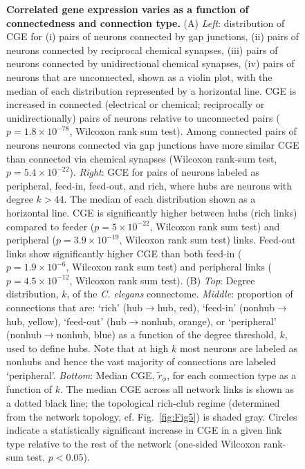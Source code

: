 \documentclass[10pt,letterpaper]{article}
\begin{document}
 \begin{figure}[h]
 \centering
\caption{{\bf Correlated gene expression varies as a function of connectedness and connection type.}
(A) \textit{Left}: distribution of CGE for (i) pairs of neurons connected by gap junctions, (ii) pairs of neurons connected by reciprocal chemical synapses, (iii) pairs of neurons connected by unidirectional chemical synapses, (iv) pairs of neurons that are unconnected, shown as a violin plot, with the median of each distribution represented by a horizontal line.
CGE is increased in connected (electrical or chemical; reciprocally or unidirectionally) pairs of neurons relative to unconnected pairs ($p = 1.8 \times 10^{-78}$, Wilcoxon rank sum test).
Among connected pairs of neurons neurons connected via gap junctions have more similar CGE than connected via chemical synapses (Wilcoxon rank-sum test, $p = 5.4 \times 10^{-22}$).
\textit{Right}: GCE for pairs of neurons labeled as peripheral, feed-in, feed-out, and rich, where hubs are neurons with degree $k>44$. The median of each distribution shown as a horizontal line.
CGE is significantly higher between hubs (rich links) compared to feeder ($p = 5 \times 10^{-22}$, Wilcoxon rank sum test) and peripheral ($p = 3.9 \times 10^{-19}$, Wilcoxon rank sum test) links.
Feed-out links show significantly higher CGE than both feed-in ($p = 1.9 \times 10^{-6}$, Wilcoxon rank sum test) and peripheral links ($p = 4.5 \times 10^{-12}$, Wilcoxon rank sum test).
(B)
\emph{Top}: Degree distribution, $k$, of the \emph{C. elegans} connectome.
\emph{Middle}: proportion of connections that are:
`rich' (hub$\rightarrow$hub, red),
`feed-in' (nonhub$\rightarrow$hub, yellow),
`feed-out' (hub$\rightarrow$nonhub, orange), or
`peripheral' (nonhub$\rightarrow$nonhub, blue) as a function of the degree threshold, $k$, used to define hubs.
Note that at high $k$ most neurons are labeled as nonhubs and hence the vast majority of connections are labeled `peripheral'.
 \emph{Bottom}: Median CGE, $\tilde{r}_\phi$, for each connection type as a function of $k$.
The median CGE across all network links is shown as a dotted black line; the topological rich-club regime (determined from the network topology, cf. Fig.~\ref{fig:Fig5}) is shaded gray.
Circles indicate a statistically significant increase in CGE in a given link type relative to the rest of the network (one-sided Wilcoxon rank-sum test, $p < 0.05$).
}
 \label{fig:Fig6}
\end{figure}
\end{document}
